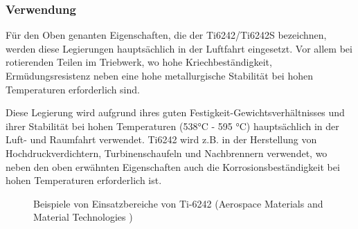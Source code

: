 \subsubsection{Verwendung}
Für den Oben genanten Eigenschaften, die der Ti6242/Ti6242S bezeichnen, werden diese Legierungen hauptsächlich in der Luftfahrt eingesetzt. Vor allem bei rotierenden Teilen im Triebwerk, wo  hohe Kriechbeständigkeit, Ermüdungsresistenz  neben eine hohe metallurgische Stabilität bei hohen Temperaturen erforderlich sind. 





Diese Legierung wird aufgrund ihres guten Festigkeit-Gewichtsverhältnisses und ihrer  Stabilität bei hohen Temperaturen (538°C - 595 °C) hauptsächlich in der Luft- und Raumfahrt  verwendet.\newline
Ti6242 wird z.B. in der Herstellung von Hochdruckverdichtern, Turbinenschaufeln und Nachbrennern verwendet, wo neben den oben erwähnten Eigenschaften auch die Korrosionsbeständigkeit bei hohen Temperaturen erforderlich ist. \newline



\begin{figure}[H]
	\centering
	\hspace{5ex}
	\caption{Beispiele von Einsatzbereiche von Ti-6242 (Aerospace Materials and Material Technologies )}
	
\end{figure}


